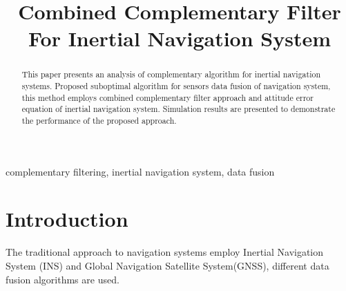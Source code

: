 \documentclass[conference, utf8]{IEEEtran}
\begin{document}
%
\title{Combined Complementary Filter For Inertial Navigation System}


\author{
\and
{}
}

\maketitle


\begin{abstract}
This paper presents an analysis of complementary algorithm for inertial 
navigation systems. Proposed suboptimal algorithm for sensors data 
fusion of navigation system, this method employs combined complementary 
filter approach and attitude error equation of inertial navigation system. 
Simulation results are presented to demonstrate the  performance of the 
proposed approach. 
\end{abstract}

\begin{IEEEkeywords}
complementary filtering, inertial navigation system, data fusion
\end{IEEEkeywords}



%
\IEEEpeerreviewmaketitle



\section{Introduction}
The traditional approach to navigation systems employ Inertial Navigation System (INS) and 
Global Navigation Satellite System(GNSS), different data fusion algorithms are used.
\end{document}
